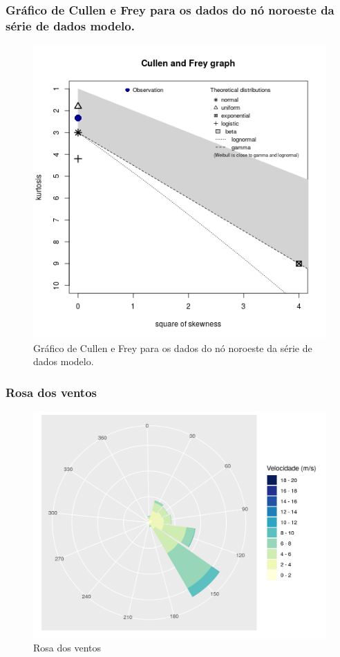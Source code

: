 \documentclass{beamer}
\begin{document}
\begin{frame}
	\frametitle{Gráfico de Cullen e Frey para os dados do nó noroeste da série de dados modelo.}
	\begin{figure}
		\centering
		\includegraphics[width=\textwidth]{cullen}
		\caption{Gráfico de Cullen e Frey para os dados do nó noroeste da série de dados modelo.}
	\end{figure}
\end{frame}

\begin{frame}
	\frametitle{Rosa dos ventos}
	\begin{figure}
		\centering
		\includegraphics[width=\textwidth]{windrose}
		\caption{Rosa dos ventos}
	\end{figure}
\end{frame}
\end{document}
